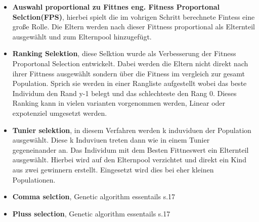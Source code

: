 \begin{itemize}
\item \textbf{Auswahl proportional zu Fittnes eng. Fitness Proportonal Selction(FPS)}, hierbei spielt die im vohrigen Schritt berechnete Fintess eine große Rolle. Die Eltern werden nach dieser Fittness proportional als Elternteil ausgewählt und zum Elternpool hinzugefügt.

\item \textbf{Ranking Selektion}, diese Selktion wurde als Verbesserung der Fitness Proportonal Selection entwickelt. Dabei werden die Eltern nicht direkt nach ihrer Fittness ausgewählt sondern über die Fitness im vergleich zur gesamt Population. Sprich sie werden in einer Rangliste aufgestellt wobei das beste Individum den Rand y-1 belegt und das schlechteste den Rang 0. Dieses Ranking kann in vielen varianten vorgenommen werden, Linear oder expotenziel umgesetzt werden. 

\item \textbf{Tunier selektion}, in diesem Verfahren werden k induviduen der Population ausgewählt. Diese k Induviuen treten dann wie in einem Tunier gegeneinander an. Das Individum mit dem Besten Fittneswert ein Elternteil ausgewählt. Hierbei wird auf den Elternpool verzichtet und direkt ein Kind aus zwei gewinnern erstellt. Eingesetzt wird dies bei eher kleinen Populationen.
\item \textbf{Comma selction}, Genetic algorithm essentails s.17
\item \textbf{Pluss selection}, Genetic algorithm essentails s.17
\end{itemize}



